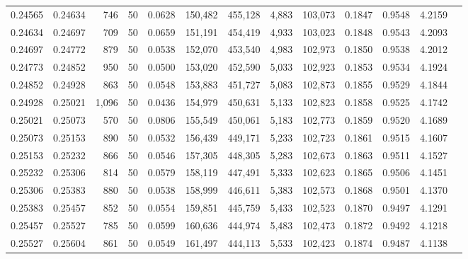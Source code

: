 \begin{tabular}{rrrrrrrrrrrrr}
0.24565 & 0.24634 &   746 &  50 &                                     0.0628 & 150,482 & 455,128 &   4,883 & 103,073 & 0.1847 & 0.9548 & 4.2159 \\
0.24634 & 0.24697 &   709 &  50 &                                     0.0659 & 151,191 & 454,419 &   4,933 & 103,023 & 0.1848 & 0.9543 & 4.2093 \\
0.24697 & 0.24772 &   879 &  50 &                                     0.0538 & 152,070 & 453,540 &   4,983 & 102,973 & 0.1850 & 0.9538 & 4.2012 \\
0.24773 & 0.24852 &   950 &  50 &                                     0.0500 & 153,020 & 452,590 &   5,033 & 102,923 & 0.1853 & 0.9534 & 4.1924 \\
0.24852 & 0.24928 &   863 &  50 &                                     0.0548 & 153,883 & 451,727 &   5,083 & 102,873 & 0.1855 & 0.9529 & 4.1844 \\
0.24928 & 0.25021 & 1,096 &  50 &                                     0.0436 & 154,979 & 450,631 &   5,133 & 102,823 & 0.1858 & 0.9525 & 4.1742 \\
0.25021 & 0.25073 &   570 &  50 &                                     0.0806 & 155,549 & 450,061 &   5,183 & 102,773 & 0.1859 & 0.9520 & 4.1689 \\
0.25073 & 0.25153 &   890 &  50 &                                     0.0532 & 156,439 & 449,171 &   5,233 & 102,723 & 0.1861 & 0.9515 & 4.1607 \\
0.25153 & 0.25232 &   866 &  50 &                                     0.0546 & 157,305 & 448,305 &   5,283 & 102,673 & 0.1863 & 0.9511 & 4.1527 \\
0.25232 & 0.25306 &   814 &  50 &                                     0.0579 & 158,119 & 447,491 &   5,333 & 102,623 & 0.1865 & 0.9506 & 4.1451 \\
0.25306 & 0.25383 &   880 &  50 &                                     0.0538 & 158,999 & 446,611 &   5,383 & 102,573 & 0.1868 & 0.9501 & 4.1370 \\
0.25383 & 0.25457 &   852 &  50 &                                     0.0554 & 159,851 & 445,759 &   5,433 & 102,523 & 0.1870 & 0.9497 & 4.1291 \\
0.25457 & 0.25527 &   785 &  50 &                                     0.0599 & 160,636 & 444,974 &   5,483 & 102,473 & 0.1872 & 0.9492 & 4.1218 \\
0.25527 & 0.25604 &   861 &  50 &                                     0.0549 & 161,497 & 444,113 &   5,533 & 102,423 & 0.1874 & 0.9487 & 4.1138 \\

\end{tabular}
